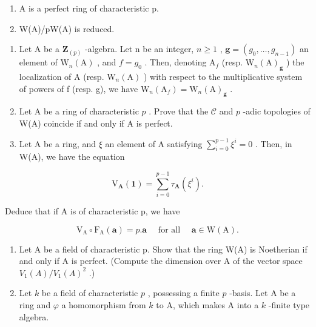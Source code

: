 \begin{enumerate}
\def\labelenumi{(\roman{enumi})}
\item
  A is a perfect ring of characteristic p.
\item
  W(A)/pW(A) is reduced.
\end{enumerate}

\begin{enumerate}
\def\labelenumi{\arabic{enumi})}
\setcounter{enumi}{5}
\item
  Let A be a \(\mathbf{Z}_{(p)}\) -algebra. Let n be an integer, \(n \geqslant 1\) , \(\boldsymbol{g} = (g_{0}, \ldots, g_{n-1})\) an element of \(\mathrm{W}_{n}(\mathrm{A})\) , and \(f = g_{0}\) . Then, denoting \(\mathrm{A}_{f}\) (resp. \(\mathrm{W}_{n}(\mathrm{A})_{\boldsymbol{g}}\) ) the localization of A (resp. \(\mathrm{W}_{n}(\mathrm{A})\) ) with respect to the multiplicative system of powers of f (resp. g), we have \(\mathrm{W}_{n}(\mathrm{A}_{f}) = \mathrm{W}_{n}(\mathrm{A})_{\boldsymbol{g}}\) .
\item
  Let A be a ring of characteristic \(p\) . Prove that the \(\mathcal{C}\) and \(p\) -adic topologies of W(A) coincide if and only if A is perfect.
\item
  Let A be a ring, and \(\xi\) an element of A satisfying \(\sum_{i=0}^{p-1} \xi^i = 0\) . Then, in W(A), we have the equation
\end{enumerate}

\[
\mathrm{V} _ {\mathbf {A}} (\mathbf {1}) = \sum_ {i = 0} ^ {p - 1} \tau_ {\mathbf {A}} (\xi^ {i}).
\]

Deduce that if A is of characteristic p, we have

\[
\mathrm{V} _ {\mathrm{A}} \circ \mathrm{F} _ {\mathrm{A}} (\boldsymbol {a}) = p. \boldsymbol {a} \quad \text { for all } \quad \boldsymbol {a} \in \mathrm{W} (\mathrm{A}).
\]

\begin{enumerate}
\def\labelenumi{\arabic{enumi})}
\setcounter{enumi}{8}
\item
  Let A be a field of characteristic p. Show that the ring W(A) is Noetherian if and only if A is perfect. (Compute the dimension over A of the vector space \(V_{1}(A)/V_{1}(A)^{2}\) .)
\item
  Let \(k\) be a field of characteristic \(p\) , possessing a finite \(p\) -basis. Let A be a ring and \(\varphi\) a homomorphism from \(k\) to A, which makes A into a \(k\) -finite type algebra.
\end{enumerate}

